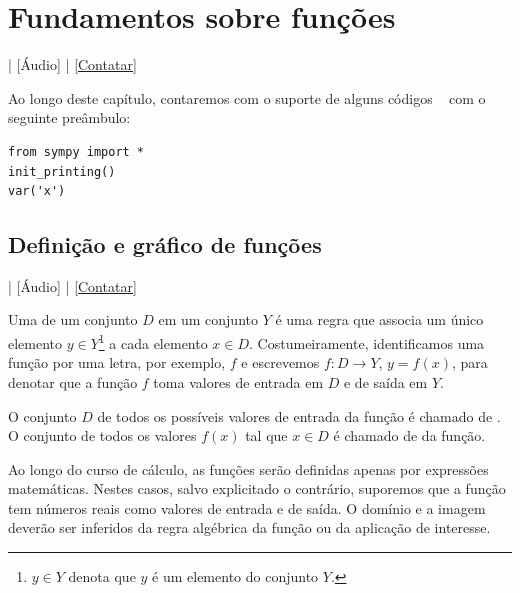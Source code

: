 
\chapter{Fundamentos sobre funções}\label{cap_funcao}
\thispagestyle{fancy}

\begin{flushright}
  [Vídeo] | [Áudio] | \href{https://phkonzen.github.io/notas/contato.html}{[Contatar]}
\end{flushright}

\ifispython
\begin{obs}\label{obs:cap_funcao_python}
Ao longo deste capítulo, contaremos com o suporte de alguns códigos \python~ com o seguinte preâmbulo:
\begin{verbatim}
from sympy import *
init_printing()
var('x')
\end{verbatim}
\end{obs}
\fi

\section{Definição e gráfico de funções}\label{cap_funcao_sec_defgrafico}

\begin{flushright}
  [Vídeo] | [Áudio] | \href{https://phkonzen.github.io/notas/contato.html}{[Contatar]}
\end{flushright}

Uma  de um conjunto $D$ em um conjunto $Y$ é uma regra que associa um único elemento $y\in Y$\footnote{$y\in Y$ denota que $y$ é um elemento do conjunto $Y$.} a cada elemento $x\in D$. Costumeiramente, identificamos uma função por uma letra, por exemplo, $f$ e escrevemos $f:D\to Y$, $y=f(x)$, para denotar que a função $f$ toma valores de entrada em $D$ e de saída em $Y$.

O conjunto $D$ de todos os possíveis valores de entrada da função é chamado de . O conjunto de todos os valores $f(x)$ tal que $x\in D$ é chamado de  da função.

Ao longo do curso de cálculo, as funções serão definidas apenas por expressões matemáticas. Nestes casos, salvo explicitado o contrário, suporemos que a função tem números reais como valores de entrada e de saída. O domínio e a imagem deverão ser inferidos da regra algébrica da função ou da aplicação de interesse.

